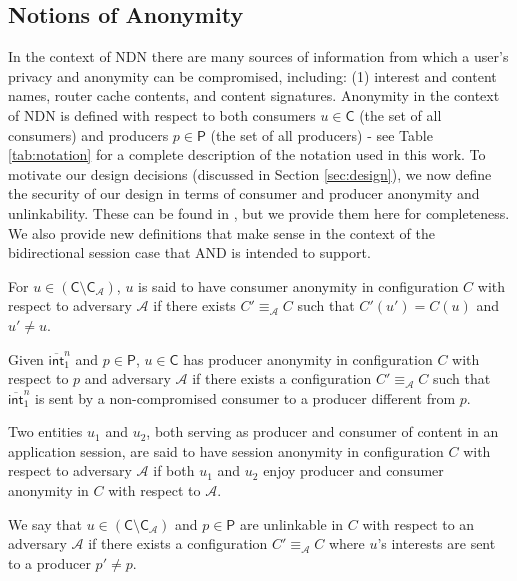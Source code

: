 \subsection{Notions of Anonymity}
In the context of NDN there are many sources of information from which a user's privacy and anonymity can be compromised, including: (1) interest and content names, router cache contents, and content signatures. Anonymity in the context of NDN is defined with respect to both consumers $u \in \mathsf{C}$ (the set of all consumers) and producers $p \in \mathsf{P}$ (the set of all producers) - see Table \ref{tab:notation} for a complete description of the notation used in this work. To motivate our design decisions (discussed in Section \ref{sec:design}), we now define the security of our design in terms of consumer and producer anonymity and unlinkability. These can be found in \cite{andana}, but we provide them here for completeness. We also provide new definitions that make sense in the context of the bidirectional session case that {\sf AND} is intended to support.
\begin{defn}
\cite{andana} For $u \in (\mathsf{C} \setminus \mathsf{C}_{\mathcal{A}})$, $u$ is said to have {\sf consumer anonymity} in configuration $C$ with respect to adversary $\mathcal{A}$ if there exists $C' \equiv_{\mathcal{A}} C$ such that $C'(u') = C(u)$ and $u' \not= u$. 
\end{defn}
\begin{defn}
\cite{andana} Given $\overline{\mathsf{int}}_1^n$ and $p \in \mathsf{P}$, $u \in \mathsf{C}$ has {\sf producer anonymity} in configuration $C$ with respect to $p$ and adversary $\mathcal{A}$ if there exists a configuration $C' \equiv_{\mathcal{A}} C$ such that $\overline{\mathsf{int}}_1^n$ is sent by a non-compromised consumer to a producer different from $p$. 
\end{defn}
\begin{defn}
Two entities $u_1$ and $u_2$, both serving as producer and consumer of content in an application session, are said to have {\sf session anonymity} in configuration $C$ with respect to adversary $\mathcal{A}$ if both $u_1$ and $u_2$ enjoy producer and consumer anonymity in $C$ with respect to $\mathcal{A}$.
\end{defn}
\begin{defn}
\cite{andana} We say that $u \in (\mathsf{C} \setminus \mathsf{C}_{\mathcal{A}})$ and $p \in \mathsf{P}$ are {\sf unlinkable} in $C$ with respect to an adversary $\mathcal{A}$ if there exists a configuration $C' \equiv_{\mathcal{A}} C$ where $u$'s interests are sent to a producer $p' \not= p$.
\end{defn}

